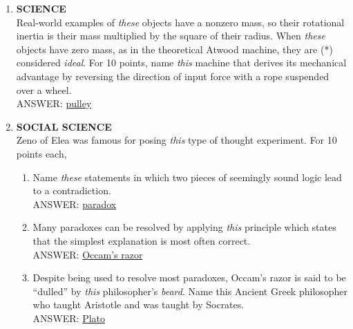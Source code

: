 \documentclass{report}
\newcommand*{\backtrack}{\setcounter{enumi}{\numexpr\theenumi-1\relax}}
\begin{document}
\begin{enumerate}
    \item \textbf{SCIENCE} \\ Real-world examples of \textit{these} objects have a nonzero mass, so their rotational inertia is their mass multiplied by the square of their radius. When \textit{these} objects have zero mass, as in the theoretical Atwood machine, they are (*) considered \textit{ideal}. For 10 points, name \textit{this} machine that derives its mechanical advantage by reversing the direction of input force with a rope suspended over a wheel. \\ ANSWER: \underline{pulley} \backtrack
    \item \textbf{SOCIAL SCIENCE} \\ Zeno of Elea was famous for posing \textit{this} type of thought experiment. For 10 points each,
    \begin{enumerate}[label=\Alph*]
        \item Name \textit{these} statements in which two pieces of seemingly sound logic lead to a contradiction. \\ ANSWER: \underline{paradox}
        \item Many paradoxes can be resolved by applying \textit{this} principle which states that the simplest explanation is most often correct. \\ ANSWER: \underline{Occam's razor}
        \item Despite being used to resolve most paradoxes, Occam's razor is said to be ``dulled'' by \textit{this} philosopher's \textit{beard}. Name this Ancient Greek philosopher who taught Aristotle and was taught by Socrates. \\ ANSWER: \underline{Plato}
    \end{enumerate}
    \newpage


\end{enumerate}
\end{document}
